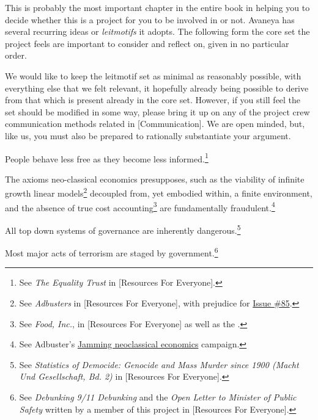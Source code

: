 

This is probably the most important chapter in the entire book in helping you to decide whether this is a project for you to be involved in or not. Avaneya has several recurring ideas or {\it leitmotifs} it adopts. The following form the core set the project feels are important to consider and reflect on, given in no particular order.

We would like to keep the leitmotif set as minimal as reasonably possible, with everything else that we felt relevant, it hopefully already being possible to derive from that which is present already in the core set. However, if you still feel the set should be modified in some way, please bring it up on any of the project crew communication methods related in [Communication]. We are open minded, but, like us, you must also be prepared to rationally substantiate your argument.

\startitemize[R]
\setupwhitespace[big]
\item
People behave less free as they become less informed.\footnote{See {\it The Equality Trust} in [Resources For Everyone].}

\item
The axioms neo-classical economics presupposes, such as the viability of infinite growth linear models\footnote{See {\it Adbusters} in [Resources For Everyone], with prejudice for \href{http://www.adbusters.org/cultureshop/backissues/85}{Issue \#85}.} decoupled from, yet embodied within, a finite environment, and the absence of true cost accounting\footnote{See {\it Food, Inc.}, in [Resources For Everyone] as well as the .} are fundamentally fraudulent.\footnote{See Adbuster's \href{http://anticap.wordpress.com/2010/10/25/jamming-neoclassical-economics/}{Jamming neoclassical economics} campaign.}

\item
All top down systems of governance are inherently dangerous.\footnote{See {\it Statistics of Democide: Genocide and Mass Murder since 1900 (Macht Und Gesellschaft, Bd. 2)} in [Resources For Everyone].}

\item
Most major acts of terrorism are staged by government.\footnote{See {\it Debunking 9/11 Debunking} and the {\it Open Letter to Minister of Public Safety} written by a member of this project in [Resources For Everyone].}

